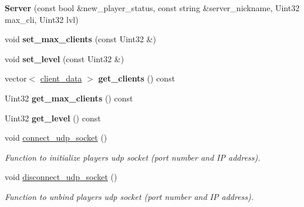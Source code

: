 \begin{DoxyCompactItemize}
\item 
\mbox{\label{classServer_ab472d29277b90a64ac00c6b237b9c3b9}} 
{\bfseries Server} (const bool \&new\+\_\+player\+\_\+status, const string \&server\+\_\+nickname, Uint32 max\+\_\+cli, Uint32 lvl)
\item 
\mbox{\label{classServer_a0aa84b089e775943ad9127bcb32be748}} 
void {\bfseries set\+\_\+max\+\_\+clients} (const Uint32 \&)
\item 
\mbox{\label{classServer_aca05bab8b2fbdb7656ce4d2441b8772c}} 
void {\bfseries set\+\_\+level} (const Uint32 \&)
\item 
\mbox{\label{classServer_ae5db7c667dafbe369108600e6b3b9197}} 
vector$<$ \hyperlink{structclient__data}{client\+\_\+data} $>$ {\bfseries get\+\_\+clients} () const
\item 
\mbox{\label{classServer_ac4c47dda4674c5b6767e60ab51bdb8c3}} 
Uint32 {\bfseries get\+\_\+max\+\_\+clients} () const
\item 
\mbox{\label{classServer_a060606cc92e029d8620af54a77f89402}} 
Uint32 {\bfseries get\+\_\+level} () const
\item 
\mbox{\label{classServer_a32cf257754accf70802f5a64c360b876}} 
void \hyperlink{classServer_a32cf257754accf70802f5a64c360b876}{connect\+\_\+udp\+\_\+socket} ()
\begin{DoxyCompactList}\small\item\em Function to initialize player\textquotesingle{}s udp socket (port number and IP address). \end{DoxyCompactList}\item 
\mbox{\label{classServer_a4d278da069a2b5cde535243434999d3f}} 
void \hyperlink{classServer_a4d278da069a2b5cde535243434999d3f}{disconnect\+\_\+udp\+\_\+socket} ()
\begin{DoxyCompactList}\small\item\em Function to unbind player\textquotesingle{}s udp socket (port number and IP address). \end{DoxyCompactList}\item 

\end{DoxyCompactItemize}
